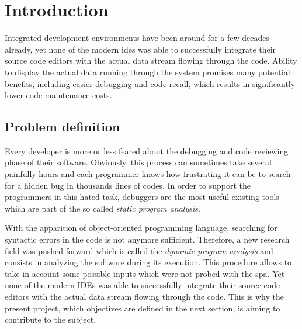 
\chapter{Introduction} %
\label{chap:introduction}

Integrated development environments have been around for a few decades already, yet none of the modern \glspl{ide} was able to successfully integrate their source code editors with the actual data stream flowing through the code. Ability to display the actual data running through the system promises many potential benefits, including easier debugging and code recall, which results in significantly lower code maintenance costs. 

\section{Problem definition}
Every developer is more or less feared about the debugging and code reviewing phase of their software. Obviously, this process can sometimes take several painfully hours and each programmer knows how frustrating it can be to search for a hidden bug in thousands lines of codes. In order to support the programmers in this hated task, debuggers are the most useful existing tools which are part of the so called \textit{static program analysis}. 

With the apparition of object-oriented programming language, searching for syntactic errors in the code is not anymore sufficient. Therefore, a new research field was pushed forward which is called the \textit{dynamic program analysis} and consists in analyzing the software during its execution. This procedure allows to take in account some possible inputs which were not probed with the \gls{spa}. Yet none of the modern IDEs was able to successfully integrate their source code editors with the actual data stream flowing through the code. This is why the present project, which objectives are defined in the next section, is aiming to contribute to the subject.

